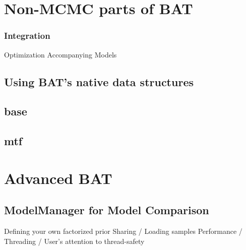 \documentclass[11pt, a4paper]{article}
\newcommand{\dan}[1]{{\color{red}{Dan: #1}}}
\newcommand{\fred}[1]{{\color{blue}{Fred: #1}}}
\begin{document}
\section{Non-MCMC parts of BAT}

\subsubsection{Integration}
\fred

\subsubsection{Optimization}
\fred

\section{Accompanying Models}

\subsection{Using BAT's native data structures}

\subsection{base}

\subsection{mtf}


\section{Advanced BAT}

\subsection{ModelManager for Model Comparison}
\fred

\subsection{Defining your own factorized prior}
\dan

\subsection{Sharing / Loading samples}
\dan

\subsection{Performance / Threading / User's attention to thread-safety}
\end{document}
